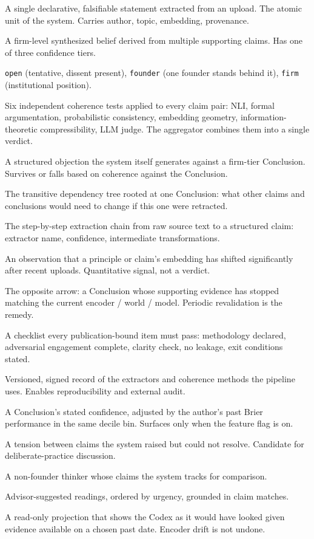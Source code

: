\documentclass[11pt,letterpaper]{article}
\begin{document}
\begin{description}[leftmargin=*,labelindent=0pt,itemsep=0.3em]
  \item[Claim] A single declarative, falsifiable statement extracted from an upload. The atomic unit of the system. Carries author, topic, embedding, provenance.
  \item[Conclusion] A firm-level synthesized belief derived from multiple supporting claims. Has one of three confidence tiers.
  \item[Confidence tier] \texttt{open} (tentative, dissent present), \texttt{founder} (one founder stands behind it), \texttt{firm} (institutional position).
  \item[Six-layer coherence] Six independent coherence tests applied to every claim pair: NLI, formal argumentation, probabilistic consistency, embedding geometry, information-theoretic compressibility, LLM judge. The aggregator combines them into a single verdict.
  \item[Adversarial challenge] A structured objection the system itself generates against a firm-tier Conclusion. Survives or falls based on coherence against the Conclusion.
  \item[Cascade] The transitive dependency tree rooted at one Conclusion: what other claims and conclusions would need to change if this one were retracted.
  \item[Provenance] The step-by-step extraction chain from raw source text to a structured claim: extractor name, confidence, intermediate transformations.
  \item[Drift event] An observation that a principle or claim's embedding has shifted significantly after recent uploads. Quantitative signal, not a verdict.
  \item[Decay] The opposite arrow: a Conclusion whose supporting evidence has stopped matching the current encoder / world / model. Periodic revalidation is the remedy.
  \item[Rigor gate] A checklist every publication-bound item must pass: methodology declared, adversarial engagement complete, clarity check, no leakage, exit conditions stated.
  \item[Method registry] Versioned, signed record of the extractors and coherence methods the pipeline uses. Enables reproducibility and external audit.
  \item[Calibration-discounted confidence] A Conclusion's stated confidence, adjusted by the author's past Brier performance in the same decile bin. Surfaces only when the feature flag is on.
  \item[Open question] A tension between claims the system raised but could not resolve. Candidate for deliberate-practice discussion.
  \item[Voice] A non-founder thinker whose claims the system tracks for comparison.
  \item[Reading queue] Advisor-suggested readings, ordered by urgency, grounded in claim matches.
  \item[Temporal replay] A read-only projection that shows the Codex as it would have looked given evidence available on a chosen past date. Encoder drift is not undone.
\end{description}
\end{document}
